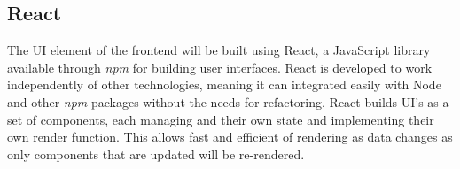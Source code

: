 \subsection{React}
The UI element of the frontend will be built using React, a JavaScript library available through \textit{npm} for building user interfaces. React is developed to work independently of other technologies, meaning it can integrated easily with Node and other \textit{npm} packages without the needs for refactoring. React builds UI's as a set of components, each managing and their own state and implementing their own render function. This allows fast and efficient of rendering as data changes as only components that are updated will be re-rendered. 

